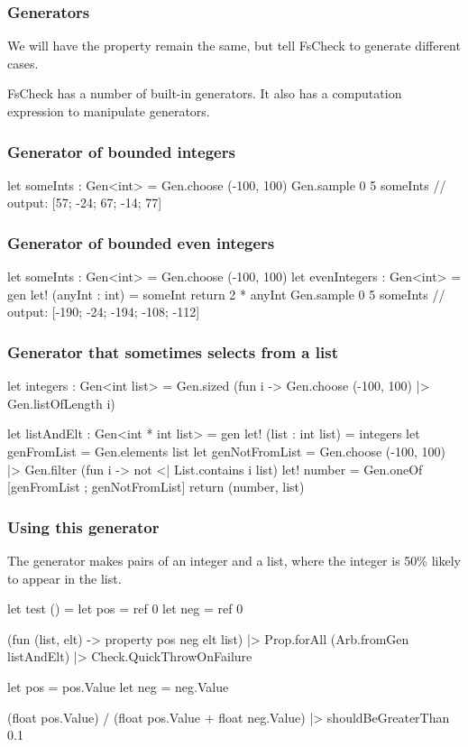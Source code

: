 \documentclass{beamer}
\begin{document}
\begin{frame}[fragile]
\frametitle{Generators}
We will have the property remain the same, but tell FsCheck to generate different cases.

FsCheck has a number of built-in generators.
It also has a computation expression to manipulate generators.
\end{frame}

\begin{frame}[fragile]
\frametitle{Generator of bounded integers}

\begin{fslisting}
let someInts : Gen<int> = Gen.choose (-100, 100)
Gen.sample 0 5 someInts
// output: [57; -24; 67; -14; 77]
\end{fslisting}
\end{frame}

\begin{frame}[fragile]
\frametitle{Generator of bounded even integers}
\begin{fslisting}
let someInts : Gen<int> = Gen.choose (-100, 100)
let evenIntegers : Gen<int> = gen {
    let! (anyInt : int) = someInt
    return 2 * anyInt
}
Gen.sample 0 5 someInts
// output: [-190; -24; -194; -108; -112]
\end{fslisting}
\end{frame}

\begin{frame}[fragile]
\frametitle{Generator that sometimes selects from a list}
\begin{fslisting}
let integers : Gen<int list> =
    Gen.sized (fun i ->
        Gen.choose (-100, 100)
        |> Gen.listOfLength i)

let listAndElt : Gen<int * int list> = gen {
    let! (list : int list) = integers
    let genFromList = Gen.elements list
    let genNotFromList =
        Gen.choose (-100, 100)
        |> Gen.filter (fun i -> not <| List.contains i list)
    let! number = Gen.oneOf [genFromList ; genNotFromList]
    return (number, list)
}
\end{fslisting}
\end{frame}

\begin{frame}[fragile]
\frametitle{Using this generator}

The generator makes pairs of an integer and a list, where the integer is 50\% likely to appear in the list.

\begin{fslisting}
[<Test>]
let test () =
    let pos = ref 0
    let neg = ref 0

    (fun (list, elt) -> property pos neg elt list)
    |> Prop.forAll (Arb.fromGen listAndElt)
    |> Check.QuickThrowOnFailure

    let pos = pos.Value
    let neg = neg.Value

    (float pos.Value) / (float pos.Value + float neg.Value)
    |> shouldBeGreaterThan 0.1
\end{fslisting}
\end{frame}
\end{document}
